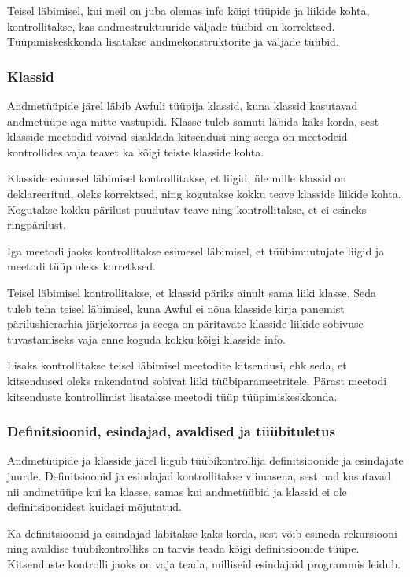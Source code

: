 \documentclass[12pt]{article}
\begin{document}
        Teisel läbimisel, kui meil on juba olemas info kõigi tüüpide ja liikide kohta, kontrollitakse, kas andmestruktuuride väljade tüübid on korrektsed. Tüüpimiskeskkonda lisatakse andmekonstruktorite ja väljade tüübid.
      \subsubsection{Klassid}
        Andmetüüpide järel läbib Awfuli tüüpija klassid, kuna klassid kasutavad andmetüüpe aga mitte vastupidi. Klasse tuleb samuti läbida kaks korda, sest klasside meetodid võivad sisaldada kitsendusi ning seega on meetodeid kontrollides vaja teavet ka kõigi teiste klasside kohta.

        Klasside esimesel läbimisel kontrollitakse, et liigid, üle mille klassid on deklareeritud, oleks korrektsed, ning kogutakse kokku teave klasside liikide kohta. Kogutakse kokku pärilust puudutav teave ning kontrollitakse, et ei esineks ringpärilust.

        Iga meetodi jaoks kontrollitakse esimesel läbimisel, et tüübimuutujate liigid ja meetodi tüüp oleks korretksed.

        Teisel läbimisel kontrollitakse, et klassid päriks ainult sama liiki klasse. Seda tuleb teha teisel läbimisel, kuna Awful ei nõua klasside kirja panemist pärilushierarhia järjekorras ja seega on päritavate klasside liikide sobivuse tuvastamiseks vaja enne koguda kokku kõigi klasside info.

        Lisaks kontrollitakse teisel läbimisel meetodite kitsendusi, ehk seda, et kitsendused oleks rakendatud sobivat liiki tüübiparameetritele. Pärast meetodi kitsenduste kontrollimist lisatakse meetodi tüüp tüüpimiskeskkonda.
      \subsubsection{Definitsioonid, esindajad, avaldised ja tüübituletus}
        Andmetüüpide ja klasside järel liigub tüübikontrollija definitsioonide ja esindajate juurde. Definitsioonid ja esindajad kontrollitakse viimasena, sest nad kasutavad nii andmetüüpe kui ka klasse, samas kui andmetüübid ja klassid ei ole definitsioonidest kuidagi mõjutatud.

        Ka definitsioonid ja esindajad läbitakse kaks korda, sest võib esineda rekursiooni ning avaldise tüübikontrolliks on tarvis teada kõigi definitsioonide tüüpe. Kitsenduste kontrolli jaoks on vaja teada, milliseid esindajaid programmis leidub.
\end{document}
